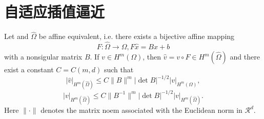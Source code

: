 \section{自适应插值逼近}
\begin{lemma}
Let   and $\hat{\Omega}$ be affine equivalent, i.e. there exists a bijective affine mapping 
\[
F: \hat{\Omega} \rightarrow \Omega, F\hat{x} = B\hat{x} + b
\]
with a nonsigular matrix $B$. If $v \in H^m(\Omega)$, then $\hat{v} = v \circ F \in H^{m}(\hat{\Omega})$ and there exist a constant $C = C(m,d)$ such that
\begin{equation}
	|\hat{v}|_{H^{m}(\hat{\Omega})} \le C \| B \|^{m}|\det B|^{-1/2}|v|_{H^{m}(\Omega)},
\end{equation}
\begin{equation}
	|v|_{H^{m}(\hat{\Omega})} \le C \| B^{-1} \|^{m}|\det B|^{-1/2}|v|_{H^{m}(\hat{\Omega})}.
\end{equation}
Here $\|\cdot \|$ denotes the matrix noem associated with the Euclidean norm in $\mathcal{R}^d$.
	\label{lemma1}
\end{lemma}

